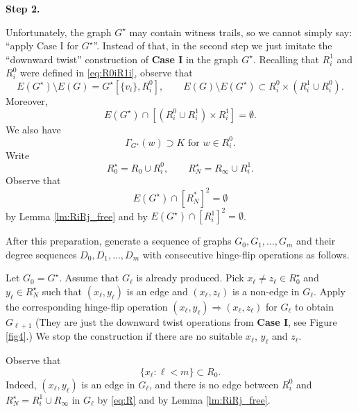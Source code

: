 \documentclass[11pt]{elsarticle}
\theoremstyle{plain}
\theoremstyle{definition}
\newcommand{\hflip}[3]{(#1,#2)\Rightarrow (#1,#3)}
\begin{document}
\noindent\textbf{Step 2.}

Unfortunately, the graph $G^\star$ may contain witness trails, so we cannot simply
say: ``apply Case I for $G^\star$''.
Instead of that, in the second step we just imitate the ``downward twist'' construction of \textbf{Case I} in the graph $G^\star$. Recalling that
 $R^1_i$ and $R^0_i$  were defined in \eqref{eq:R0iR1i},
 observe that
\begin{displaymath}
E(G^\star)\setminus E(G)= G^\star[\{v_i\},R^0_i], \qquad
E(G)\setminus E(G^\star)\subset R^0_i \times (R^1_i\cup R^0_i).
\end{displaymath}
Moreover,
\begin{equation}\label{eq:R}
E(G^\star)\cap [(R^0_i\cup R^1_i) \times R^1_i]=\emptyset.
\end{equation}
We also have
\begin{equation}\label{eq:R01}
\text{$\Gamma_{G^\star}(w)\supset K$ for $w\in R^0_i$.}
\end{equation}
Write
\begin{displaymath}
R^\star_0=R_0\cup R^0_i, \qquad
R^\star_N=R_\infty\cup R^1_i.
\end{displaymath}
Observe that
\begin{equation}\label{eq:RN}
    E(G^\star)\cap [R_N^*]^2=\emptyset
\end{equation}
by Lemma \ref{lm:RiRj_free} and by $E(G^\star)\cap {\left [R^1_i\right ]}^{2}= \emptyset$.


\medskip
After this preparation,  generate a sequence of graphs $G_0, G_1,\ldots, G_m$ and their degree sequences $D_0, D_1, \ldots, D_m$ with consecutive hinge-flip operations as follows.

Let $G_0=G^\star$. Assume that $G_\ell$ is already produced. Pick
$x_\ell \ne z_\ell \in R^\star_0$ and $y_\ell \in R^\star_N$ such that $(x_\ell, y_\ell)$ is an edge and $(x_\ell, z_\ell)$ is a non-edge in $G_\ell.$ Apply the corresponding hinge-flip operation $\hflip{x_\ell}{y_\ell}{z_\ell}$ for $G_\ell$ to obtain $G_{\ell+1}$ (They are just the {downward twist} operations from \textbf{Case I}, see Figure \ref{fig4}.) We stop the construction if there are no suitable $x_\ell$, $y_\ell$ and $z_\ell$.

Observe that
\begin{equation}\label{eq:x}
\{x_\ell: \ell<m\}\subset R_0.
\end{equation}
Indeed, $(x_\ell, y_\ell)$ is an edge in $G_\ell $, and there is no edge between $R^0_i$ and $R^\star_N=R^1_i\cup R_\infty$ in $G_\ell$ by  \eqref{eq:R} and by Lemma \ref{lm:RiRj_free}.
\end{document}
